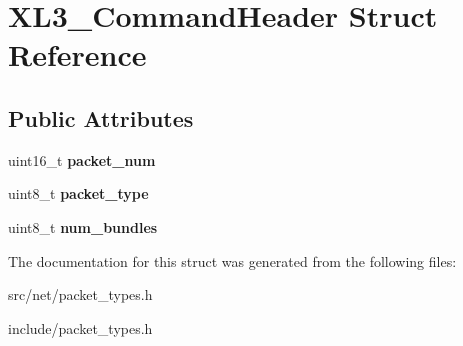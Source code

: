 \hypertarget{structXL3__CommandHeader}{
\section{XL3\_\-CommandHeader Struct Reference}
\label{structXL3__CommandHeader}
}
\subsection*{Public Attributes}
\begin{DoxyCompactItemize}
\item 
\hypertarget{structXL3__CommandHeader_a271a0c8b929c593f385da37270f2c53e}{
uint16\_\-t {\bfseries packet\_\-num}}
\label{structXL3__CommandHeader_a271a0c8b929c593f385da37270f2c53e}

\item 
\hypertarget{structXL3__CommandHeader_a79db71ffa460502971672d5625c4dd4f}{
uint8\_\-t {\bfseries packet\_\-type}}
\label{structXL3__CommandHeader_a79db71ffa460502971672d5625c4dd4f}

\item 
\hypertarget{structXL3__CommandHeader_aeca858d00e4ba856a3b4b9e6ba433a20}{
uint8\_\-t {\bfseries num\_\-bundles}}
\label{structXL3__CommandHeader_aeca858d00e4ba856a3b4b9e6ba433a20}

\end{DoxyCompactItemize}


The documentation for this struct was generated from the following files:\begin{DoxyCompactItemize}
\item 
src/net/packet\_\-types.h\item 
include/packet\_\-types.h\end{DoxyCompactItemize}
